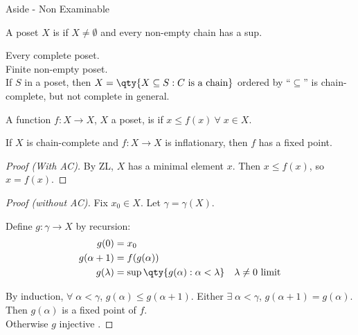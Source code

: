 \begin{aside}{Aside - Non Examinable}
    \begin{definition}
        A poset $X$ is  if $X \neq \emptyset$ and every non-empty chain has a sup.
    \end{definition}

    \begin{example}
        Every complete poset. \\
        Finite non-empty poset. \\
        If $S$ in a poset, then $X = \qty{X \subseteq S : C \text{ is a chain}}$ ordered by ``$\subseteq$'' is chain-complete, but not complete in general.
    \end{example}

    \begin{definition}[Inflationary]
        A function $f : X \to X$, $X$ a poset, is  if $x \leq f(x) \ \forall \; x \in X$.
    \end{definition}

    \begin{theorem}
        If $X$ is chain-complete and $f : X \to X$ is inflationary, then $f$ has a fixed point.
    \end{theorem}

    \begin{proof}[Proof (With AC)]
        By ZL, $X$ has a minimal element $x$.
        Then $x \leq f(x)$, so $x = f(x)$.
    \end{proof}

    \begin{proof}[Proof (without AC)]
        Fix $x_0 \in X$.
        Let $\gamma = \gamma(X)$.

        Define $g : \gamma \to X$ by recursion:
        \begin{align*}
            g(0) &= x_0 \\
            g(\alpha + 1) &= f(g(\alpha)) \\
            g(\lambda) &= \sup \qty{g(\alpha) : \alpha < \lambda} \quad \text{$\lambda \neq 0$ limit}
        \end{align*}

        By induction, $\forall \; \alpha < \gamma$, $g(\alpha) \leq g(\alpha + 1)$.
        Either $\exists \; \alpha < \gamma$, $g(\alpha + 1) = g(\alpha)$.
        Then $g(\alpha)$ is a fixed point of $f$. \\
        Otherwise $g$ injective \Lightning.
    \end{proof}


\end{aside}

